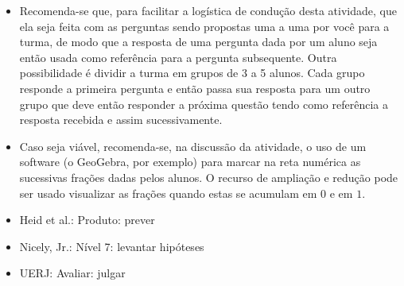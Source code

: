\begin{multicols}{2}
  
 
\begin{itemize} %
    \item       Recomenda-se que, para facilitar a logística de condução desta 
atividade, que ela seja feita com as perguntas sendo propostas uma a uma por 
você para a turma, de modo que a resposta de uma pergunta dada por um aluno seja 
então usada como referência para a pergunta subsequente. Outra possibilidade é 
dividir a turma em grupos de 3 a 5 alunos. Cada grupo responde a primeira 
pergunta e então passa sua resposta para um outro grupo que deve então responder 
a próxima questão tendo como referência a resposta recebida e assim 
sucessivamente.
    \item       Caso seja viável, recomenda-se, na discussão da atividade, o uso 
de um software (o GeoGebra, por exemplo) para marcar na reta numérica as 
sucessivas frações dadas pelos alunos. O recurso de ampliação e redução pode ser 
usado visualizar as frações quando estas se acumulam em       $0$       e em     
  $1$.
\end{itemize} %
  
  
   \vspace{.1cm}
  
 \vspace{.1cm}
   
\begin{itemize} %
    \item       Heid et al.: Produto: prever
    \item       Nicely, Jr.: Nível 7: levantar hipóteses
    \item       UERJ: Avaliar: julgar
\end{itemize} %


\end{multicols}
